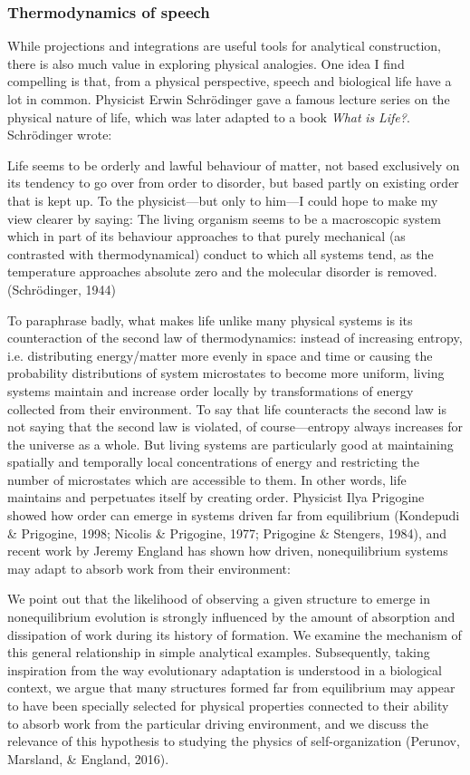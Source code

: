 \subsubsection{Thermodynamics of speech}

While projections and integrations are useful tools for analytical construction, there is also much value in exploring physical analogies. One idea I find compelling is that, from a physical perspective, speech and biological life have a lot in common. Physicist Erwin Schrödinger gave a famous lecture series on the physical nature of life, which was later adapted to a book \textit{What} \textit{is} \textit{Life?}. Schrödinger wrote:

Life seems to be orderly and lawful behaviour of matter, not based exclusively on its tendency to go over from order to disorder, but based partly on existing order that is kept up. To the physicist—but only to him—I could hope to make my view clearer by saying: The living organism seems to be a macroscopic system which in part of its behaviour approaches to that purely mechanical (as contrasted with thermodynamical) conduct to which all systems tend, as the temperature approaches absolute zero and the molecular disorder is removed. (Schrödinger, 1944)

  To paraphrase badly, what makes life unlike many physical systems is its counteraction of the second law of thermodynamics: instead of increasing entropy, i.e. distributing energy/matter more evenly in space and time or causing the probability distributions of system microstates to become more uniform, living systems maintain and increase order locally by transformations of energy collected from their environment. To say that life counteracts the second law is not saying that the second law is violated, of course—entropy always increases for the universe as a whole. But living systems are particularly good at maintaining spatially and temporally local concentrations of energy and restricting the number of microstates which are accessible to them. In other words, life maintains and perpetuates itself by creating order. Physicist Ilya Prigogine showed how order can emerge in systems driven far from equilibrium (Kondepudi \& Prigogine, 1998; Nicolis \& Prigogine, 1977; Prigogine \& Stengers, 1984), and recent work by Jeremy England has shown how driven, nonequilibrium systems may adapt to absorb work from their environment:

We point out that the likelihood of observing a given structure to emerge in nonequilibrium evolution is strongly influenced by the amount of absorption and dissipation of work during its history of formation. We examine the mechanism of this general relationship in simple analytical examples. Subsequently, taking inspiration from the way evolutionary adaptation is understood in a biological context, we argue that many structures formed far from equilibrium may appear to have been specially selected for physical properties connected to their ability to absorb work from the particular driving environment, and we discuss the relevance of this hypothesis to studying the physics of self-organization (Perunov, Marsland, \& England, 2016).

